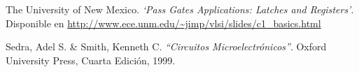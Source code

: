 \documentclass[twocolumn]{IEEEtran}
\begin{document}

\begin{thebibliography}{99} 
   The University of New Mexico.
  {\em `Pass Gates Applications: Latches and Registers'}.
  Disponible en \url{http://www.ece.unm.edu/~jimp/vlsi/slides/c1_basics.html}
  
   Sedra, Adel S. \& Smith, Kenneth C.
  {\em "`Circuitos Microelectrónicos"'}.
  Oxford University Press, Cuarta Edición, 1999.  
\end{thebibliography}
\end{document}
